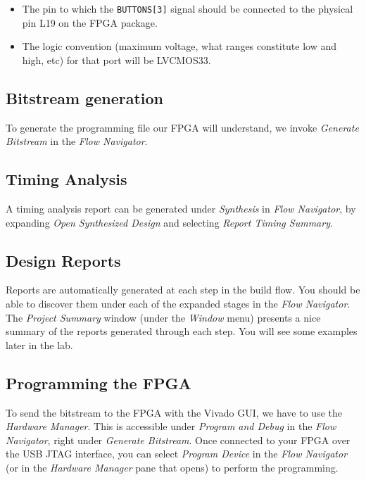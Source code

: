 \documentclass[11pt]{article}
\begin{document}
\begin{itemize}
\item The pin to which the \verb|BUTTONS[3]| signal should be connected to the physical pin L19 on the FPGA package.
\item The logic convention (maximum voltage, what ranges constitute low and high, etc) for that port will be LVCMOS33.
\end{itemize}

\subsection{Bitstream generation}
To generate the programming file our FPGA will understand, we invoke \emph{Generate Bitstream} in the \emph{Flow Navigator}.

\subsection{Timing Analysis}
A timing analysis report can be generated under \emph{Synthesis} in \emph{Flow Navigator}, by expanding \emph{Open Synthesized Design} and selecting \emph{Report Timing Summary}.

\subsection{Design Reports}
Reports are automatically generated at each step in the build flow. You should be able to discover them under each of the expanded stages in the \emph{Flow Navigator}. The \emph{Project Summary} window (under the \emph{Window} menu) presents a nice summary of the reports generated through each step. You will see some examples later in the lab.

\subsection{Programming the FPGA}
To send the bitstream to the FPGA with the Vivado GUI, we have to use the \emph{Hardware Manager}. This is accessible under \emph{Program and Debug} in the \emph{Flow Navigator}, right under \emph{Generate Bitstream}. Once connected to your FPGA over the USB JTAG interface, you can select \emph{Program Device} in the \emph{Flow Navigator} (or in the \emph{Hardware Manager} pane that opens) to perform the programming.

\end{document}
